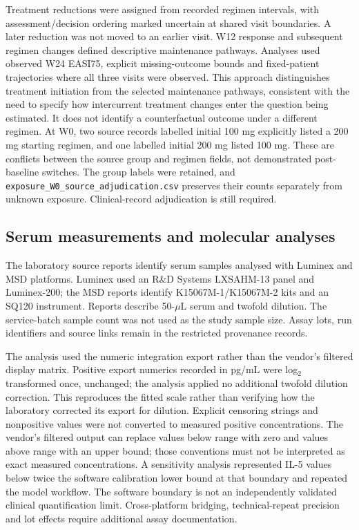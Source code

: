 Treatment reductions were assigned from recorded regimen intervals, with assessment/decision ordering marked uncertain at shared visit boundaries. A later reduction was not moved to an earlier visit. W12 response and subsequent regimen changes defined descriptive maintenance pathways. Analyses used observed W24 EASI75, explicit missing-outcome bounds and fixed-patient trajectories where all three visits were observed. This approach distinguishes treatment initiation from the selected maintenance pathways, consistent with the need to specify how intercurrent treatment changes enter the question being estimated.\citep{iche9r1} It does not identify a counterfactual outcome under a different regimen. At W0, two source records labelled initial 100 mg explicitly listed a 200 mg starting regimen, and one labelled initial 200 mg listed 100 mg. These are conflicts between the source group and regimen fields, not demonstrated post-baseline switches. The group labels were retained, and \texttt{exposure\_W0\_source\_adjudication.csv} preserves their counts separately from unknown exposure. Clinical-record adjudication is still required.

\subsection{Serum measurements and molecular analyses}
The laboratory source reports identify serum samples analysed with Luminex and MSD platforms. Luminex used an R\&D Systems LXSAHM-13 panel and Luminex-200; the MSD reports identify K15067M-1/K15067M-2 kits and an SQ120 instrument. Reports describe 50-$\mu$L serum and twofold dilution. The service-batch sample count was not used as the study sample size. Assay lots, run identifiers and source links remain in the restricted provenance records.

The analysis used the numeric integration export rather than the vendor's filtered display matrix. Positive export numerics recorded in pg/mL were log$_2$ transformed once, unchanged; the analysis applied no additional twofold dilution correction. This reproduces the fitted scale rather than verifying how the laboratory corrected its export for dilution. Explicit censoring strings and nonpositive values were not converted to measured positive concentrations. The vendor's filtered output can replace values below range with zero and values above range with an upper bound; those conventions must not be interpreted as exact measured concentrations. A sensitivity analysis represented IL-5 values below twice the software calibration lower bound at that boundary and repeated the model workflow. The software boundary is not an independently validated clinical quantification limit. Cross-platform bridging, technical-repeat precision and lot effects require additional assay documentation.


